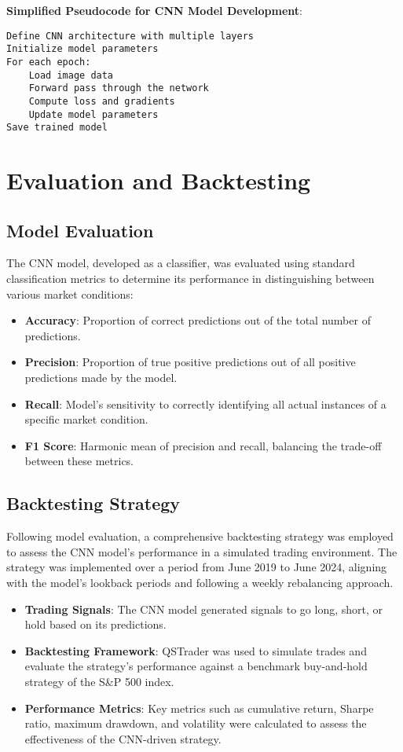 \textbf{Simplified Pseudocode for CNN Model Development}:
\begin{verbatim}
Define CNN architecture with multiple layers
Initialize model parameters
For each epoch:
    Load image data
    Forward pass through the network
    Compute loss and gradients
    Update model parameters
Save trained model
\end{verbatim}

\section{Evaluation and Backtesting}

\subsection{Model Evaluation}

The CNN model, developed as a classifier, was evaluated using standard classification metrics to determine its performance in distinguishing between various market conditions:

\begin{itemize}
    \item \textbf{Accuracy}: Proportion of correct predictions out of the total number of predictions.
    \item \textbf{Precision}: Proportion of true positive predictions out of all positive predictions made by the model.
    \item \textbf{Recall}: Model's sensitivity to correctly identifying all actual instances of a specific market condition.
    \item \textbf{F1 Score}: Harmonic mean of precision and recall, balancing the trade-off between these metrics.
\end{itemize}

\subsection{Backtesting Strategy}

Following model evaluation, a comprehensive backtesting strategy was employed to assess the CNN model's performance in a simulated trading environment. The strategy was implemented over a period from June 2019 to June 2024, aligning with the model's lookback periods and following a weekly rebalancing approach.

\begin{itemize}
    \item \textbf{Trading Signals}: The CNN model generated signals to go long, short, or hold based on its predictions.
    \item \textbf{Backtesting Framework}: QSTrader was used to simulate trades and evaluate the strategy's performance against a benchmark buy-and-hold strategy of the S\&P 500 index.
    \item \textbf{Performance Metrics}: Key metrics such as cumulative return, Sharpe ratio, maximum drawdown, and volatility were calculated to assess the effectiveness of the CNN-driven strategy.
\end{itemize}

